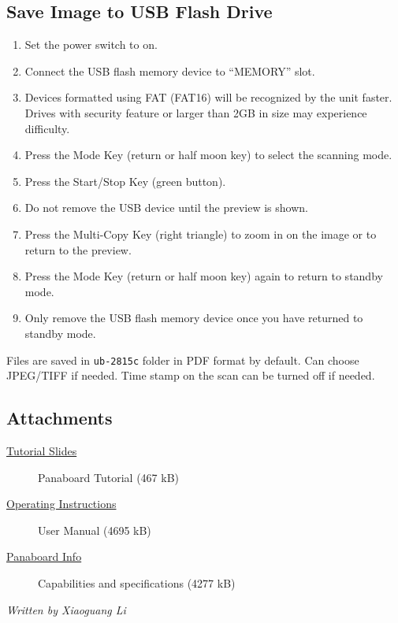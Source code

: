 \documentclass[12pt,a4paper]{article}
\begin{document}
\subsection*{Save Image to USB Flash Drive}
\begin{enumerate}
    \item Set the power switch to on.
    \item Connect the USB flash memory device to “MEMORY” slot.
    \item Devices formatted using FAT (FAT16) will be recognized by the unit faster. Drives with security feature or larger than 2GB in size may experience difficulty.
    \item Press the Mode Key (return or half moon key) to select the scanning mode.
    \item Press the Start/Stop Key (green button).
    \item Do not remove the USB device until the preview is shown.
    \item Press the Multi-Copy Key (right triangle) to zoom in on the image or to return to the preview.
    \item Press the Mode Key (return or half moon key) again to return to standby mode.
    \item Only remove the USB flash memory device once you have returned to standby mode.
\end{enumerate}
Files are saved in \texttt{ub-2815c} folder in PDF format by default. Can choose JPEG/TIFF if needed.
Time stamp on the scan can be turned off if needed.

\subsection*{Attachments}
\begin{description}
    \item[\href{https://www.sc.fsu.edu/computing/tech-docs/attachments/375-panaboard/Panaboard_Tutorial.pdf}{Tutorial Slides}] Panaboard Tutorial (467 kB)
    \item[\href{https://www.sc.fsu.edu/computing/tech-docs/attachments/375-panaboard/User_Manual.pdf}{Operating Instructions}] User Manual (4695 kB)
    \item[\href{https://www.sc.fsu.edu/computing/tech-docs/attachments/375-panaboard/Panaboard_Info.pdf}{Panaboard Info}] Capabilities and specifications (4277 kB)
\end{description}
\hfill \textit{Written by Xiaoguang Li}
\end{document}
